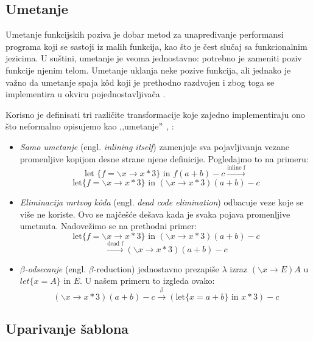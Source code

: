 \subsection{Umetanje}
Umetanje funkcijskih poziva je dobar metod za unapređivanje performansi programa koji se sastoji iz malih funkcija, kao što je čest slučaj sa funkcionalnim jezicima. U suštini, umetanje je veoma jednostavno: potrebno je zameniti poziv funkcije njenim telom. Umetanje uklanja neke pozive funkcija, ali jednako je važno da umetanje spaja k\^ od koji je prethodno razdvojen i zbog toga se implementira u okviru pojednostavljivača \cite{compilation-by-program-transformation}.

Korisno je definisati tri različite transformacije koje zajedno implementiraju ono što neformalno opisujemo kao ‚‚umetanje$"$ \cite{secrets-haskell-compiler-inliner, compilation-by-program-transformation}, :
\begin{itemize}
	\item \textit{Samo umetanje} (engl. \textit{inlining itself}) zamenjuje sva pojavljivanja vezane promenljive kopijom desne strane njene definicije. Pogledajmo to na primeru:
	$$ \text{let } \{ f = \backslash x \longrightarrow x*3 \} \text{ in } f (a + b) - c \stackrel{\text{inline f}}{\longrightarrow} $$
	$$\text{let} \{ f = \backslash x \longrightarrow x*3 \} \text{ in } (\backslash x \longrightarrow x*3) (a + b) - c$$
	
	\item \textit{Eliminacija mrtvog k\^oda} (engl. \textit{dead code elimination}) odbacuje veze koje se više ne koriste. Ovo se najčešće dešava kada je svaka pojava promenljive umetnuta. Nadovežimo se na prethodni primer:
	$$\text{let} \{ f = \backslash x \longrightarrow x*3 \} \text{ in } (\backslash x \longrightarrow x*3) (a + b) - c $$ 
	$$\stackrel{\text{dead f}}{\longrightarrow}  (\backslash x \longrightarrow x*3) (a + b) - c $$
	
	\item \textit{$\beta$-odsecanje} (engl. \textit{$\beta$}-reduction) jednostavno prezapiše $\lambda$ izraz $(\backslash x \longrightarrow E) A$ u $let \{x = A\} \text{ in } E$. U našem primeru to izgleda ovako:
	$$(\backslash x \longrightarrow x*3) (a + b) - c \stackrel{\beta}{\longrightarrow} (\text{let} \{ x = a+b \} \text{ in } x*3) - c$$
\end{itemize}


\subsection{Uparivanje šablona}

